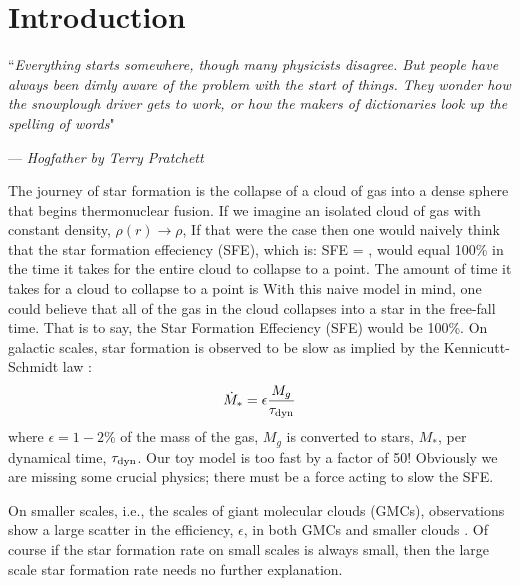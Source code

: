\documentclass[../dissertation.tex]{subfiles}
\begin{document}
\chapter{Introduction}

\singlespace
\epigraph{``\emph{Everything starts somewhere, though many physicists disagree. But people have always been dimly aware of the problem with the start of things. They wonder how the snowplough driver gets to work, or how the makers of dictionaries look up the spelling of words}"}{--- \textit{Hogfather by Terry Pratchett}}

\dblspace

The journey of star formation is the collapse of a cloud of gas into a dense sphere that begins thermonuclear fusion.
If we imagine an isolated cloud of gas with constant density, $\rho(r) \rightarrow \rho$,
If that were the case then one would naively think that the star formation effeciency (SFE), which is:
%
\be
{\rm SFE} = , 
\ee
%
would equal 100\% in the time it takes for the entire cloud to collapse to a point.
The amount of time it takes for a cloud to collapse to a point is 
With this naive model in mind, one could believe that all of the gas in the cloud collapses into a star in the free-fall time.
That is to say, the Star Formation Effeciency (SFE) would be 100\%.
On galactic scales, star formation is observed to be slow as implied by the Kennicutt-Schmidt law \citep{1998ApJ...498..541K,2008AJ....136.2782L}:
\begin{equation}\label{eq:kennicutt}
 \dot{M}_* = \epsilon \frac{M_g}{\tau_{\rm dyn}}
\end{equation}
where $\epsilon = 1-2\%$ of the mass of the gas, $M_g$ is converted to stars, $M_*$, per dynamical time, $\tau_{\rm dyn}$. 
Our toy model is too fast by a factor of 50! 
Obviously we are missing some crucial physics; there must be a force acting to slow the SFE.

On smaller scales, i.e., the scales of giant molecular clouds (GMCs), observations show a large scatter in the efficiency, $\epsilon$, in both GMCs \citep{2016ApJ...833..229L} and smaller clouds \citep{2014ApJ...782..114E}. 
Of course if the star formation rate on small scales is always small, then the large scale star formation rate needs no further explanation.
\end{document}
